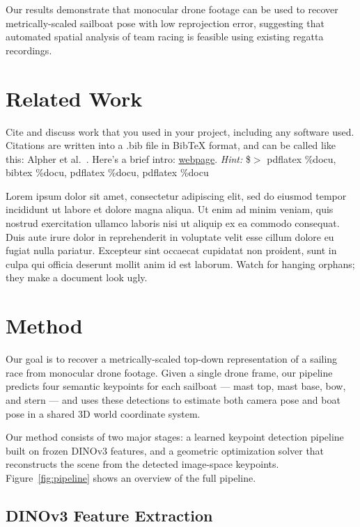 Our results demonstrate that monocular drone footage can be used to recover metrically-scaled sailboat pose with low reprojection error, suggesting that automated spatial analysis of team racing is feasible using existing regatta recordings.

\section{Related Work}

Cite and discuss work that you used in your project, including any software used. Citations are written into a .bib file in BibTeX format, and can be called like this: Alpher et al.~\cite{Alpher04}. Here's a brief intro: \href{http://www.andy-roberts.net/writing/latex/bibliographies}{webpage}. \emph{Hint:} \$$>$ pdflatex \%docu, bibtex \%docu, pdflatex \%docu, pdflatex \%docu

Lorem ipsum dolor sit amet, consectetur adipiscing elit, sed do eiusmod tempor incididunt ut labore et dolore magna aliqua. Ut enim ad minim veniam, quis nostrud exercitation ullamco laboris nisi ut aliquip ex ea commodo consequat. Duis aute irure dolor in reprehenderit in voluptate velit esse cillum dolore eu fugiat nulla pariatur. Excepteur sint occaecat cupidatat non proident, sunt in culpa qui officia deserunt mollit anim id est laborum. Watch for hanging orphans; they make a document look ugly.

\section{Method}

Our goal is to recover a metrically-scaled top-down representation of a sailing race from monocular drone footage. Given a single drone frame, our pipeline predicts four semantic keypoints for each sailboat --- mast top, mast base, bow, and stern --- and uses these detections to estimate both camera pose and boat pose in a shared 3D world coordinate system.

Our method consists of two major stages: a learned keypoint detection pipeline built on frozen DINOv3 features, and a geometric optimization solver that reconstructs the scene from the detected image-space keypoints. Figure~\ref{fig:pipeline} shows an overview of the full pipeline.

\subsection{DINOv3 Feature Extraction}

